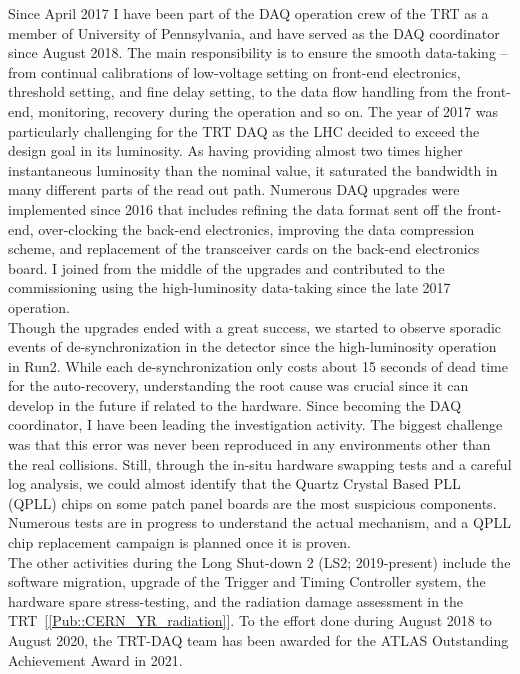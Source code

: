 \documentclass[12pt]{article}
\begin{document}
Since April 2017 I have been part of the DAQ operation crew of the TRT as a member of University of Pennsylvania,
and have served as the DAQ coordinator since August 2018.
The main responsibility is to ensure the smooth data-taking -- from continual calibrations of low-voltage setting on front-end electronics, threshold setting, and fine delay setting,
to the data flow handling from the front-end, monitoring, recovery during the operation and so on.
The year of 2017 was particularly challenging for the TRT DAQ as the LHC decided to exceed the design goal in its luminosity. 
As having providing almost two times higher instantaneous luminosity than the nominal value, it saturated the bandwidth in many different parts of the read out path.
Numerous DAQ upgrades were implemented since 2016 that includes refining the data format sent off the front-end, 
over-clocking the back-end electronics, 
improving the data compression scheme,
and replacement of the transceiver cards on the back-end electronics board.
I joined from the middle of the upgrades and contributed to the commissioning using the high-luminosity data-taking since the late 2017 operation. \\

Though the upgrades ended with a great success, we started to observe sporadic events of de-synchronization in the detector since the high-luminosity operation in Run2.
While each de-synchronization only costs about 15 seconds of dead time for the auto-recovery, 
understanding the root cause was crucial since it can develop in the future if related to the hardware.
Since becoming the DAQ coordinator, I have been leading the investigation activity.
The biggest challenge was that this error was never been reproduced in any environments other than the real collisions.
Still, through the in-situ hardware swapping tests and a careful log analysis,
we could almost identify that the Quartz Crystal Based PLL (QPLL) chips on some patch panel boards are the most suspicious components.
Numerous tests are in progress to understand the actual mechanism, and a QPLL chip replacement campaign is planned once it is proven. \\

The other activities during the Long Shut-down 2 (LS2; 2019-present) include the software migration, 
upgrade of the Trigger and Timing Controller system, the hardware spare stress-testing, and the radiation damage assessment in the TRT~[\ref{Pub::CERN_YR_radiation}].
To the effort done during August 2018 to August 2020, the TRT-DAQ team has been awarded for the ATLAS Outstanding Achievement Award in 2021. 
\end{document}

